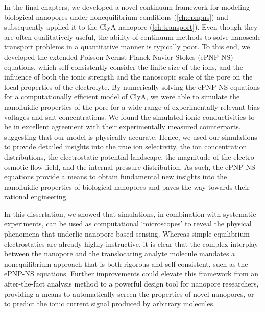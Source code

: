 In the final chapters, we developed a novel continuum framework for modeling biological nanopores under
nonequilibrium conditions (\cref{ch:epnpns}) and subsequently applied it to the ClyA nanopore
(\cref{ch:transport}). Even though they are often qualitatively useful, the ability of continuum methods to
solve nanoscale transport problems in a quantitative manner is typically poor. To this end, we developed the
extended Poisson-Nernst-Planck-Navier-Stokes ({ePNP-NS}) equations, which self-consistently consider the
finite size of the ions, and the influence of both the ionic strength and the nanoscopic scale of the pore on
the local properties of the electrolyte. By numerically solving the {ePNP-NS} equations for a computationally
efficient model of ClyA, we were able to simulate the nanofluidic properties of the pore for a wide range of
experimentally relevant bias voltages and salt concentrations. We found the simulated ionic conductivities to
be in excellent agreement with their experimentally measured counterparts, suggesting that our model is
physically accurate. Hence, we used our simulations to provide detailed insights into the true ion
selectivity, the ion concentration distributions, the electrostatic potential landscape, the magnitude of the
electro-osmotic flow field, and the internal pressure distribution. As such, the {ePNP-NS} equations provide a
means to obtain fundamental new insights into the nanofluidic properties of biological nanopores and paves the
way towards their rational engineering.

In this dissertation, we showed that simulations, in combination with systematic experiments, can be used as
computational `microscopes' to reveal the physical phenomena that underlie nanopore-based sensing. Whereas
simple equilibrium electrostatics are already highly instructive, it is clear that the complex interplay
between the nanopore and the translocating analyte molecule mandates a nonequilibrium approach that is both
rigorous and self-consistent, such as the {ePNP-NS} equations. Further improvements could elevate this
framework from an after-the-fact analysis method to a powerful design tool for nanopore researchers, providing
a means to automatically screen the properties of novel nanopores, or to predict the ionic current signal
produced by arbitrary molecules.


\cleardoublepage

